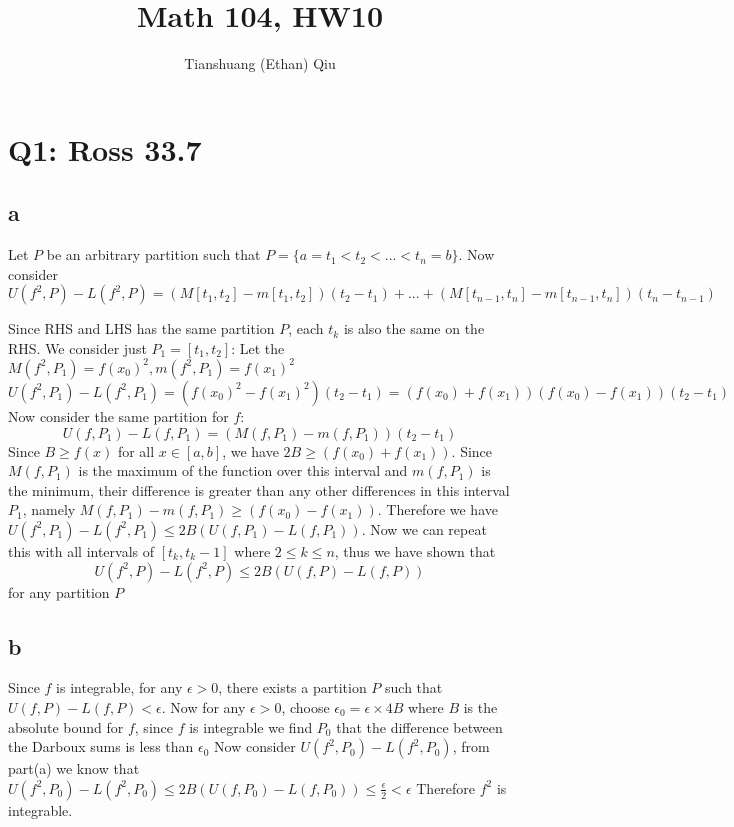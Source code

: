 \documentclass[12pt]{article}
\author{Tianshuang (Ethan) Qiu}
\begin{document}
\title{Math 104, HW10}
\maketitle
\newpage

\section{Q1: Ross 33.7}
\subsection{a}
Let $P$ be an arbitrary partition such that $P=\{a=t_1 < t_2 < ... < t_n = b\}$. Now consider
$$U(f^2,P) - L(f^2,P) = (M[t_1,t_2]-m[t_1,t_2])(t_2-t_1) + ... + (M[t_{n-1},t_n]-m[t_{n-1},t_n])(t_{n}-t_{n-1})$$

Since RHS and LHS has the same partition $P$, each $t_k$ is also the same on the RHS. We consider just $P_1=[t_1, t_2]$:
\newline
Let the $M(f^2,P_1)=f(x_0)^2, m(f^2,P_1)=f(x_1)^2$
$$U(f^2,P_1) - L(f^2,P_1) = (f(x_0)^2-f(x_1)^2)(t_2-t_1) = (f(x_0)+f(x_1))(f(x_0)-f(x_1))(t_2-t_1)$$
Now consider the same partition for $f$:
$$U(f,P_1) - L(f,P_1) =(M(f,P_1)-m(f,P_1))(t_2-t_1)$$
Since $B \geq f(x)$ for all $x \in [a,b]$, we have $2B \geq (f(x_0)+f(x_1))$. Since $M(f,P_1)$ is the maximum of the function over this interval and $m(f,P_1)$ is the minimum, their difference is greater than any other differences in this interval $P_1$, namely $M(f,P_1)-m(f,P_1) \geq (f(x_0)-f(x_1))$.
\newline
Therefore we have $U(f^2,P_1) - L(f^2,P_1) \leq 2B(U(f,P_1) - L(f,P_1))$. Now we can repeat this with all intervals of $[t_k, t_k-1]$ where $2 \leq k \leq n$, thus we have shown that $$U(f^2,P) - L(f^2,P) \leq 2B(U(f,P) - L(f,P))$$ for any partition $P$

\subsection{b}
Since $f$ is integrable, for any $\epsilon > 0$, there exists a partition $P$ such that $U(f,P)-L(f,P)<\epsilon$. Now for any $\epsilon > 0$, choose $\epsilon_0 = \epsilon \times 4B$ where $B$ is the absolute bound for $f$, since $f$ is integrable we find $P_0$ that the difference between the Darboux sums is less than $\epsilon_0$
\newline
Now consider $U(f^2,P_0)-L(f^2,P_0)$, from part(a) we know that $U(f^2,P_0)-L(f^2,P_0) \leq 2B(U(f,P_0)-L(f,P_0)) \leq \frac{\epsilon}{2}<\epsilon$
\newline
Therefore $f^2$ is integrable.
\end{document}
